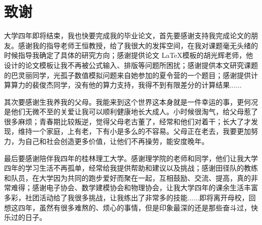 \section{致\quad 谢} %


大学四年即将结束，我也快要完成我的毕业论文，首先要感谢支持我完成论文的朋友。感谢我的指导老师王恒教授，给了我很大的发挥空间，在我对课题毫无头绪的时候指导我确定了具体的研究方向；感谢提供论文 \LaTeX 模板的胡光辉老师，他设计的论文模板让我不再被公式输入、排版等问题所困扰；感谢提供本文研究课题的巴灵丽同学，光孤子数值模拟问题来自她参加的夏令营的一个题目；感谢提供计算算力的裴俊杰同学，没有他的算力支持，我得不到有限差分的计算结果$\ldots\ldots$

其次要感谢生我养我的父母。我能来到这个世界这本身就是一件幸运的事，更何况是他们无微不至的关爱让我可以顺利健康地长大成人。小时候很淘气，给父母惹了很多麻烦；青春期比较叛逆，觉得父母老古董了，经常和他们对着干；长大了才发现，维持一个家庭，上有老，下有小是多么的不容易。父母正在老去，我要更加努力，为自己和社会创造更多价值，让他们不再操劳，能安度晚年。

最后要感谢陪伴我四年的桂林理工大学。感谢理学院的老师和同学，他们让我大学四年的学习生活不再孤单，经常给我提供帮助和建议以及挑战；感谢田径队的教练和队员，在大学因为共同的跑步爱好而聚在一起，互相鼓励、交流、提高，真的非常难得；感谢电子协会、数学建模协会和物理协会，让我大学四年的课余生活丰富多彩，社团活动给了我很多挑战，让我练出了非常多的技能$\ldots\ldots$即将离开母校，回想这四年，虽然有很多难熬的、烦心的事情，但是印象最深的还是那些奋斗过，快乐过的日子。
\newpage
